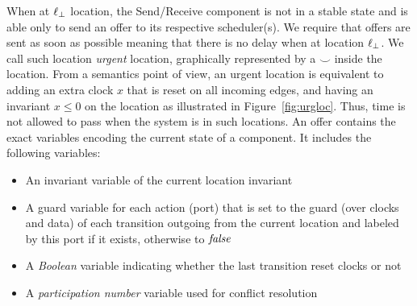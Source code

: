 When at $\ell_{\perp}$ location, the Send/Receive component is not in a stable state and is able only
to send an offer to its respective scheduler(s). We require that offers are sent as soon as 
possible meaning that there is no delay when at location $\ell_{\perp}$. We call such location
\emph{urgent} location, graphically represented by a $\smile$ inside the location. 
From a semantics point of view, an urgent location is equivalent to adding an extra clock
$x$ that is reset on all incoming edges, and having an invariant $x\le0$ on the location 
as illustrated in Figure~\ref{fig:urgloc}. Thus, time is not allowed to pass when the system 
is in such locations.  
An offer contains the exact variables encoding the current state of a component. It includes
the following variables:
\begin{itemize}
  \item An invariant variable of the current location invariant 
  \item A guard variable for each action (port) that is set to the guard (over clocks and data)
    of each transition outgoing from the current location and labeled by this port if it exists, 
    otherwise to $\textnormal{\textit{false}}$
  \item A \emph{Boolean} variable indicating whether the last transition reset clocks or not 
  \item A \emph{participation number} variable used for conflict resolution
\end{itemize}


